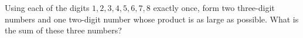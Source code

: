 Using each of the digits $1,2,3,4,5,6,7,8$ exactly once, form two three-digit numbers and one two-digit number whose product is as large as possible. What is the sum of these three numbers?
